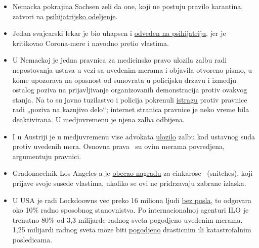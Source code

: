 \begin{itemize}
{  drone} u potraznji za zabranjenim grupisanjima gradjana.
\item
  Nemacka pokrajina Sachsen zeli da one, koji ne postuju pravilo
  karantina, zatvori na
  \href{https://www.welt.de/politik/deutschland/article207198029/Coronavirus-Sachsen-will-Quarantaene-Verweigerer-in-Psychiatrien-sperren.html}{psihijatrijsko
  odeljenje}.
\item
  Jedan svajcarski lekar je bio uhapsen i
  \href{https://www.blick.ch/news/schweiz/mittelland/in-baden-ag-polizei-in-vollmontur-im-einsatz-id15841510.html}{odveden
  na psihijatriju}, jer je kritikovao Corona-mere i navodno pretio
  vlastima.
\item
  U Nemackoj je jedna pravnica za medicinsko pravo ulozila zalbu radi
  nepostovanja ustava u vezi sa uvedenim merama i objavila otvoreno
  pismo, u kome upozorava na opasnost od sunovrata u policijsku drzavu i
  izmedju ostalog poziva na prijavljivanje organizovanih demonstracija
  protiv ovakvog stanja. Na to su javno tuzilastvo i policija pokrenuli
  \href{https://www.morgenweb.de/mannheimer-morgen_artikel,-coronavirus-aufruf-zu-straftaten-ermittlungen-gegen-heidelberger-rechtsanwaeltin-_arid,1627078.html}{istragu}
  protiv pravnice radi „poziva na kaznjivo delo``; internet stranica
  pravnice je neko vreme bila deaktivirana. U medjuvremenu je njena
  zalba odbijena.
\item
  I u Austriji je u medjuvremenu vise advokata
  \href{https://wien.orf.at/stories/3043172/}{ulozilo} zalbu kod
  ustavnog suda protiv uvedenih mera. Osnovna prava ~su ovim merama
  povredjena, argumentuju pravnici.
\item
  Gradonacelnik Los Angeles-a je
  \href{https://townhall.com/tipsheet/bethbaumann/2020/04/04/la-mayor-garcetti-says-snitches-get-rewards-for-ratting-out-their-neighbors-n2566348}{obecao
  nagradu} za cinkarose ~(snitches), koji prijave svoje susede vlastima,
  ukoliko se ovi ne pridrzavaju zabrane izlaska.
\item
  U USA je radi Lockdoowns vec preko 16 miliona ljudi
  \href{https://www.nytimes.com/2020/04/09/us/coronavirus-us-news.html}{bez
  posla}, to odgovara oko 10\% radno sposobnog stanovnistva. Po
  internacionalnoj agenturi ILO je trenutno 80\% od 3,3 milijarde radnog
  sveta pogodjeno uvedenim merama. 1,25 milijardi radnog sveta moze biti
  \href{https://www.ilo.org/global/about-the-ilo/newsroom/news/WCMS_740893/lang--en/index.htm}{pogodjeno}
  drasticnim ili katastrofalnim posledicama.
\end{itemize}

